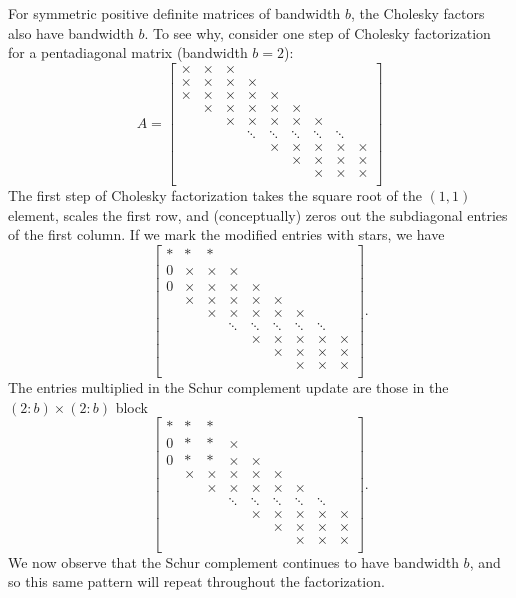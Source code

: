 \documentclass[12pt, leqno]{article} %
\begin{document}
For symmetric positive definite matrices of bandwidth $b$, the
Cholesky factors also have bandwidth $b$.  To see why, consider one
step of Cholesky factorization for a pentadiagonal matrix (bandwidth
$b = 2$):
\[
A = \begin{bmatrix}
  \times & \times & \times \\
  \times & \times & \times & \times \\
  \times & \times & \times & \times & \times \\
  & \times & \times & \times & \times & \times \\  
  & & \times & \times & \times & \times & \times \\
  & & & \ddots & \ddots & \ddots & \ddots & \ddots \\
  & & & & \times & \times & \times & \times & \times \\
  & & & & & \times & \times & \times & \times \\
  & & & & & & \times & \times & \times \\
  \end{bmatrix}
\]
The first step of Cholesky factorization takes the square root of the
$(1,1)$ element, scales the first row, and (conceptually) zeros out
the subdiagonal entries of the first column.  If we mark the modified
entries with stars, we have
\[
  \begin{bmatrix}
  * & * & * \\
  0 & \times & \times & \times \\
  0 & \times & \times & \times & \times \\
  & \times & \times & \times & \times & \times \\  
  & & \times & \times & \times & \times & \times \\
  & & & \ddots & \ddots & \ddots & \ddots & \ddots \\
  & & & & \times & \times & \times & \times & \times \\
  & & & & & \times & \times & \times & \times \\
  & & & & & & \times & \times & \times \\
  \end{bmatrix}.
\]
The entries multiplied in the Schur complement update are those in the
$(2:b) \times (2:b)$ block
\[
  \begin{bmatrix}
  * & * & * \\
  0 & * & * & \times \\
  0 & * & * & \times & \times \\
  & \times & \times & \times & \times & \times \\  
  & & \times & \times & \times & \times & \times \\
  & & & \ddots & \ddots & \ddots & \ddots & \ddots \\
  & & & & \times & \times & \times & \times & \times \\
  & & & & & \times & \times & \times & \times \\
  & & & & & & \times & \times & \times \\
  \end{bmatrix}.
\]
We now observe that the Schur complement continues to have bandwidth
$b$, and so this same pattern will repeat throughout the
factorization.
\end{document}
